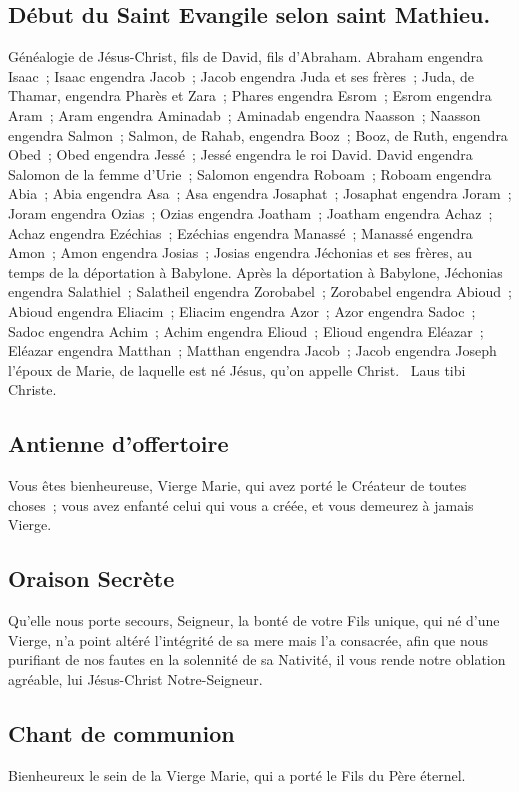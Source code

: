 \begin{multicols}{2}
\subsection*{Début du Saint Evangile selon saint Mathieu.}
Généalogie de Jésus-Christ, fils de David, fils d’Abraham. Abraham engendra Isaac ; Isaac engendra Jacob ; Jacob engendra Juda et ses frères ; Juda, de Thamar, engendra Pharès et Zara ; Phares engendra Esrom ; Esrom engendra Aram ; Aram engendra Aminadab ; Aminadab engendra Naasson ; Naasson engendra Salmon ; Salmon, de Rahab, engendra Booz ; Booz, de Ruth, engendra Obed ; Obed engendra Jessé ; Jessé engendra le roi David. David engendra Salomon de la femme d’Urie ; Salomon engendra Roboam ; Roboam engendra Abia ; Abia engendra Asa ; Asa engendra Josaphat ; Josaphat engendra Joram ; Joram engendra Ozias ; Ozias engendra Joatham ; Joatham engendra Achaz ; Achaz engendra Ezéchias ; Ezéchias engendra Manassé ; Manassé engendra Amon ; Amon engendra Josias ; Josias engendra Jéchonias et ses frères, au temps de la déportation à Babylone. Après la déportation à Babylone, Jéchonias engendra Salathiel ; Salatheil engendra Zorobabel ; Zorobabel engendra Abioud ; Abioud engendra Eliacim ; Eliacim engendra Azor ; Azor engendra Sadoc ; Sadoc engendra Achim ; Achim engendra Elioud ; Elioud engendra Eléazar ; Eléazar engendra Matthan ; Matthan engendra Jacob ; Jacob engendra Joseph l’époux de Marie, de laquelle est né Jésus, qu’on appelle Christ.
{\textbf \rb\ Laus tibi Christe.}


\subsection*{Antienne d'offertoire}
Vous êtes bienheureuse, Vierge Marie, qui avez porté le Créateur de toutes choses ; vous avez enfanté celui qui vous a créée, et vous demeurez à jamais Vierge.

\subsection*{Oraison Secrète}
Qu’elle nous porte secours, Seigneur, la bonté de votre Fils unique, qui né d’une Vierge, n’a point altéré l’intégrité de sa mere mais l’a consacrée, afin que nous purifiant de nos fautes en la solennité de sa Nativité, il vous rende notre oblation agréable, lui Jésus-Christ Notre-Seigneur.

\subsection*{Chant de communion}
Bienheureux le sein de la Vierge Marie, qui a porté le Fils du Père éternel.


\end{multicols}
